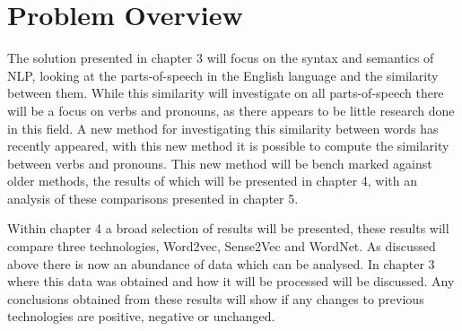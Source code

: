 \section{Problem Overview}
The solution presented in chapter 3 will focus on the syntax and semantics of NLP, looking at the parts-of-speech in the English language and the similarity between them. While this similarity will investigate on all parts-of-speech there will be a focus on verbs and pronouns, as there appears to be little research done in this field. A new method for investigating this similarity between words has recently appeared, with this new method it is possible to compute the similarity between verbs and pronouns. This new method will be bench marked against older methods, the results of which will be presented in chapter 4, with an analysis of these comparisons presented in chapter 5.

Within chapter 4 a broad selection of results will be presented, these results will compare three technologies, Word2vec, Sense2Vec and WordNet. As discussed above there is now an abundance of data which can be analysed. In chapter 3 where this data was obtained and how it will be processed will be discussed. Any conclusions obtained from these results will show if any changes to previous technologies are positive, negative or unchanged.